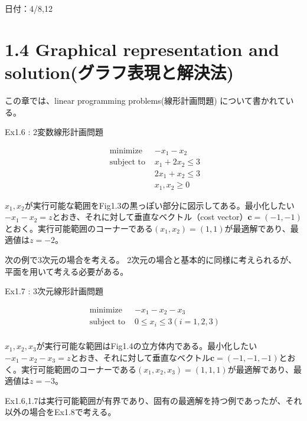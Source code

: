\documentclass{jsarticle}
\begin{document}
日付：4/8,12

\section*{1.4 Graphical representation and solution(グラフ表現と解決法)}

この章では、linear programming problems(線形計画問題) について書かれている。\par
Ex1.6 : 2変数線形計画問題\par
\begin{equation}
\begin{array}{cc}
\text { minimize } & -x_{1}-x_{2} \\
\text { subject to } & x_{1}+2 x_{2} \leq 3 \\
& 2 x_{1}+x_{2}\leq 3 \\
& x_{1}, x_{2} \geq 0
\end{array}
\end{equation}

${x_1,x_2}$が実行可能な範囲をFig1.3の黒っぽい部分に図示してある。最小化したい$-x_1-x_2=z$とおき、それに対して垂直なベクトル（cost vector）$\bm{c}=(-1,-1)$とおく。実行可能範囲のコーナーである$(x_1,x_2)=(1,1)$が最適解であり、最適値は$z=-2$。\par

次の例で3次元の場合を考える。
2次元の場合と基本的に同様に考えられるが、平面を用いて考える必要がある。\par

Ex1.7 : 3次元線形計画問題\par

\begin{equation}
\begin{array}{cc}
\text { minimize } & -x_{1}-x_{2}-x_{3} \\
\text { subject to } & 0 \leq x_{i} \leq 3 (i=1,2,3) \\
\end{array}
\end{equation}

$x_1,x_2,x_3$が実行可能な範囲はFig1.4の立方体内である。最小化したい$-x_1-x_2-x_3=z$とおき、それに対して垂直なベクトル$\bm{c}=(-1,-1,-1)$とおく。実行可能範囲のコーナーである$(x_1,x_2,x_3)=(1,1,1)$が最適解であり、最適値は$z=-3$。\par

Ex1.6,1.7は実行可能範囲が有界であり、固有の最適解を持つ例であったが、それ以外の場合をEx1.8で考える。
\end{document}
